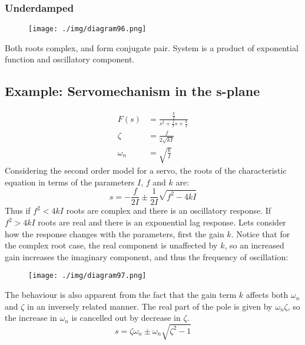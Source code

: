 \subsubsection{Underdamped}
\begin{figure}[H]
  \centerline{\texttt{[image: ./img/diagram96.png]}}
  \caption{}
\end{figure}
Both roots complex, and form conjugate pair. System is a product of exponential function and oscillatory component.
\subsection{Example: Servomechanism in the s-plane}
\begin{align}
  F(s)     & = \frac{\frac{k}{I}}{s^2 + \frac{f}{I}s + \frac{k}{I}} \\
  \zeta    & = \frac{f}{2\sqrt{kI}}                                 \\
  \omega_n & = \sqrt{\frac{k}{I}}
\end{align}
Considering the second order model for a servo, the roots of the characteristic equation in terms of the parameters $I$, $f$ and $k$ are:
\begin{equation}
  s = - \frac{f}{2I} \pm \frac{1}{2I} \sqrt{f^2 - 4kI}
\end{equation}
Thus if $f^2 < 4kI$ roots are complex and there is an oscillatory response. If $f^2 > 4kI$ roots are real and there is an exponential lag response. Lets consider how the response changes with the parameters, first the gain $k$. Notice that for the complex root case, the real component is unaffected by $k$, so an increased gain increases the imaginary component, and thus the frequency of oscillation:
\begin{figure}[H]
  \centerline{\texttt{[image: ./img/diagram97.png]}}
  \caption{}
\end{figure}
The behaviour is also apparent from the fact that the gain term $k$ affects both $\omega_n$ and $\zeta$ in an inversely related manner. The real part of the pole is given by $\omega_n \zeta$, so the increase in $\omega_n$ is cancelled out by decrease in $\zeta$.
\begin{equation}
  s = \zeta \omega_n \pm \omega_n \sqrt{\zeta^2 - 1}
\end{equation}
